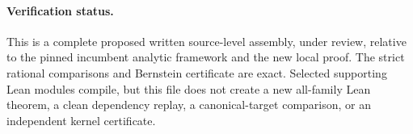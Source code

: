 \paragraph{Verification status.}
This is a complete proposed written source-level assembly, under review,
relative to the pinned incumbent analytic framework and the new local
proof. The strict rational comparisons and Bernstein certificate are
exact. Selected supporting Lean modules compile, but this file does not
create a new all-family Lean theorem, a clean dependency replay, a
canonical-target comparison, or an independent kernel certificate.
